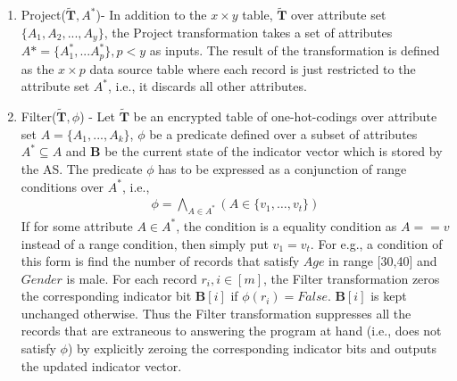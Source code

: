 {\begin{enumerate}
	
	\item \textsf{Project}($\tilde{\mathbf{T}},A^*$)- In addition to the $ x \times y$ table, $\tilde{\mathbf{T}}$ over attribute set $\{A_1, A_2, ..., A_y\}$, the \textsf{Project} transformation takes a set of attributes $A*=\{A^*_1,...A^*_p\}, p < y$ as inputs. The result of the transformation is defined as the $x \times p$ data source table where each record is just restricted to the attribute set $A^*$, i.e., it discards all other attributes. \\
  \item \textsf{Filter}($\tilde{\mathbf{T}},\phi$) - Let $\tilde{\mathbf{T}}$ be an encrypted table of one-hot-codings over attribute set $A=\{A_1,...,A_k\}$, $\phi$ be a  predicate defined over a subset of attributes $A^*\subseteq A$ and $\mathbf{B}$ be the current state of the indicator vector which is stored by the \textsf{AS}. The predicate $\phi$ has to be expressed as a conjunction of range conditions over $A^*$, i.e.,\begin{gather}\phi = \bigwedge_{A \in A^*}(A \in \{v_{1},\ldots,v_{t}\} ) \label{phi} \end{gather} If for some attribute $A \in A^*$, the condition is a equality condition as $A==v$ instead of a range condition, then simply put $v_1=v_t$. For e.g., a condition of this form is find the number of records that satisfy $Age$ in range [30,40] and $Gender$ is male. For each record $r_i, i \in [m]$, the Filter transformation zeros the corresponding indicator bit $\mathbf{B}[i] $ if $\phi(r_i)=False$. $\mathbf{B}[i] $ is kept unchanged otherwise. Thus the \textsf{Filter} transformation suppresses all the records that are extraneous to answering the program at hand (i.e., does not satisfy $\phi$) by explicitly zeroing the corresponding indicator bits and outputs the updated indicator vector. %

\end{enumerate}}

